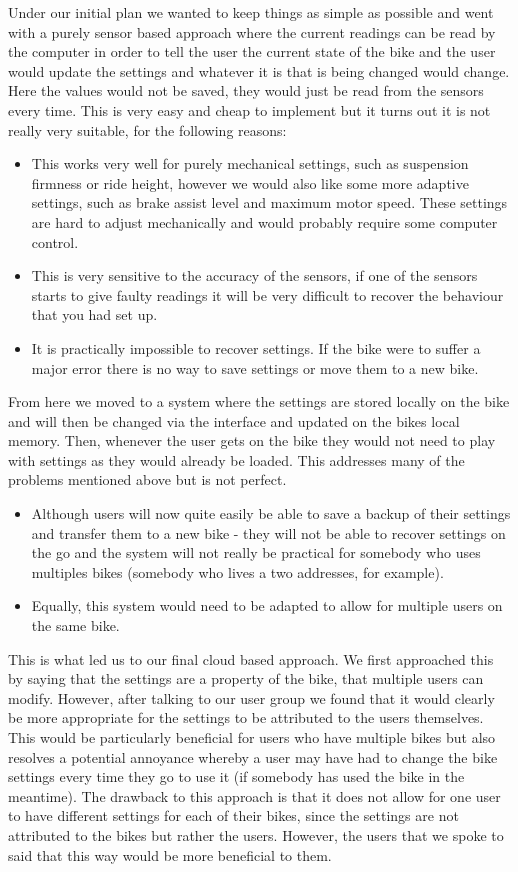 \documentclass[a4paper]{report}
\begin{document}
{Under our initial plan we wanted to keep things as simple as possible and went with a purely sensor based approach where the current readings can be read by the computer in order to tell the user the current state of the bike and the user would update the settings and whatever it is that is being changed would change. Here the values would not be saved, they would just be read from the sensors every time. This is very easy and cheap to implement but it turns out it is not really very suitable, for the following reasons:
\begin{itemize}
  \item This works very well for purely mechanical settings, such as suspension firmness or ride height, however we would also like some more adaptive settings, such as brake assist level and maximum motor speed. These settings are hard to adjust mechanically and would probably require some computer control.
  \item This is very sensitive to the accuracy of the sensors, if one of the sensors starts to give faulty readings it will be very difficult to recover the behaviour that you had set up.
  \item It is practically impossible to recover settings. If the bike were to suffer a major error there is no way to save settings or move them to a new bike.
\end{itemize}
From here we moved to a system where the settings are stored locally on the bike and will then be changed via the interface and updated on the bikes local memory. Then, whenever the user gets on the bike they would not need to play with settings as they would already be loaded. This addresses many of the problems mentioned above but is not perfect.
\begin{itemize}
  \item Although users will now quite easily be able to save a backup of their settings and transfer them to a new bike - they will not be able to recover settings on the go and the system will not really be practical for somebody who uses multiples bikes (somebody who lives a two addresses, for example).
  \item Equally, this system would need to be adapted to allow for multiple users on the same bike.
\end{itemize}
This is what led us to our final cloud based approach. We first approached this by saying that the settings are a property of the bike, that multiple users can modify. However, after talking to our user group we found that it would clearly be more appropriate for the settings to be attributed to the users themselves. This would be particularly beneficial for users who have multiple bikes but also resolves a potential annoyance whereby a user may have had to change the bike settings every time they go to use it (if somebody has used the bike in the meantime). The drawback to this approach is that it does not allow for one user to have different settings for each of their bikes, since the settings are not attributed to the bikes but rather the users. However, the users that we spoke to said that this way would be more beneficial to them.


}
\end{document}
